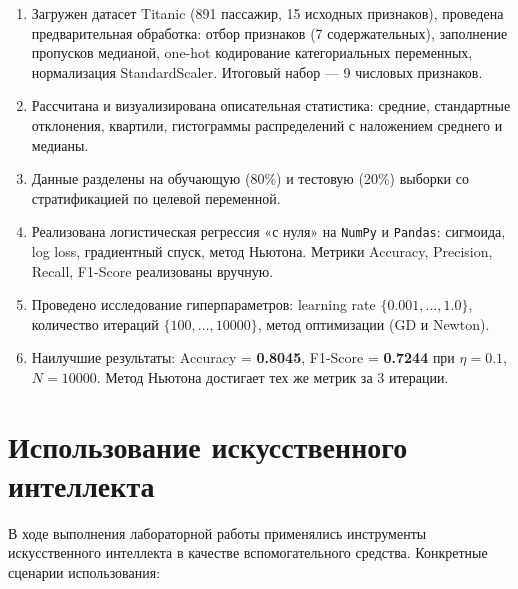 \documentclass[12pt,a4paper]{article}
\begin{document}
\begin{enumerate}
    \item Загружен датасет Titanic (891 пассажир, 15 исходных признаков),
          проведена предварительная обработка: отбор признаков (7
          содержательных), заполнение пропусков медианой, one-hot
          кодирование категориальных переменных, нормализация
          StandardScaler. Итоговый набор — 9 числовых признаков.
    \item Рассчитана и визуализирована описательная статистика:
          средние, стандартные отклонения, квартили, гистограммы
          распределений с наложением среднего и медианы.
    \item Данные разделены на обучающую (80\%) и тестовую (20\%) выборки
          со стратификацией по целевой переменной.
    \item Реализована логистическая регрессия «с нуля» на \texttt{NumPy}
          и \texttt{Pandas}: сигмоида, log loss, градиентный спуск,
          метод Ньютона. Метрики Accuracy, Precision, Recall, F1-Score
          реализованы вручную.
    \item Проведено исследование гиперпараметров: learning rate
          \(\{0.001, \dots, 1.0\}\), количество итераций
          \(\{100, \dots, 10000\}\), метод оптимизации (GD и Newton).
    \item Наилучшие результаты: Accuracy = \textbf{0.8045},
          F1-Score = \textbf{0.7244} при \(\eta = 0.1\), \(N = 10000\).
          Метод Ньютона достигает тех же метрик за 3 итерации.
\end{enumerate}

\newpage
\section*{Использование искусственного интеллекта}

В ходе выполнения лабораторной работы применялись инструменты
искусственного интеллекта в качестве вспомогательного
средства. Конкретные сценарии использования:
\end{document}
